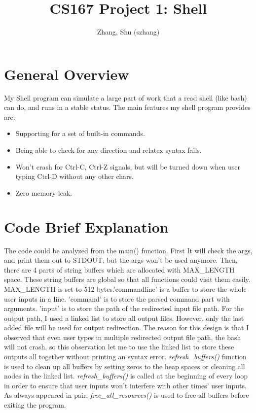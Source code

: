 \documentclass[a4paper,10pt]{article}
\title{CS167 Project 1: Shell}
\author{Zhang, Shu (szhang)}
\begin{document}
 

\maketitle

\tableofcontents

\newpage

\section{General Overview}
My Shell program can simulate a large part of work that a read shell (like bash) can do, and runs in a stable status.
The main features my shell program provides are:
\begin{itemize}
 \item Supporting for a set of built-in commands.
 \item Being able to check for any direction and relatex syntax fails.
 \item Won't crash for Ctrl-C, Ctrl-Z signals, but will be turned down when user typing Ctrl-D without any other chars.
 \item Zero memory leak.
\end{itemize}

\section{Code Brief Explanation}
The code could be analyzed from the main() function. First It will check the args, and print them out to STDOUT, but the args won't be used anymore.
Then, there are 4 parts of string buffers which are allocated with MAX\_LENGTH space. These string buffers are global so that all functions could visit
them easily. MAX\_LENGTH is set to 512 bytes.'commandline' is a buffer to store the whole user inputs in a line. 'command' is to store the parsed 
command part with arguments. 'input' is to store the path of the redirected input file path. For the output path, I used a linked list to store
all output files. However, only the last added file will be used for output redirection. The reason for this design is that I observed that even
user types in multiple redirected output file path, the bash will not crash, so this observation let me to use the linked list to store these outputs
all together without printing an syntax error. \textit{refresh\_buffers()} function is used to clean up all buffers by setting zeros to the heap spaces
or cleaning all nodes in the linked list. \textit{refresh\_buffers()} is called at the beginning of every loop in order to ensure that user inputs
won't interfere with other times' user inputs. As always appeared in pair,  \textit{free\_all\_resources()} is used to free all buffers before exiting
the program.
\end{document}
